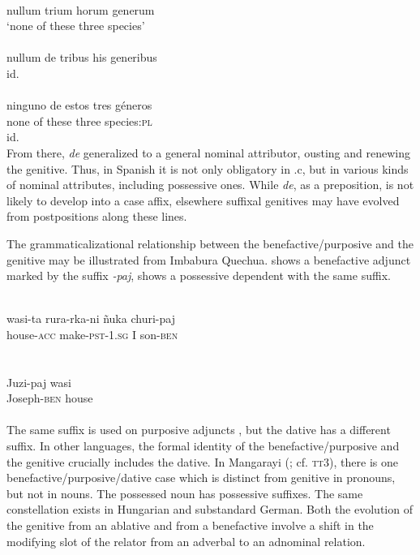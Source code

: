 \ea \label{ex:E46} 
\ea {} \\ 
nullum trium horum generum\\
\glt ‘none of these three species’\\
\ex  {} \\
 nullum de tribus his generibus\\
\glt id. \\
\ex
{} \\
\gll  ninguno  de  estos  tres géneros \\
   none  of  these  three  species:\textsc{pl}  \\
 \glt id.\\
\z
\z
\noindent From there, \textit{de} generalized to a general nominal attributor, ousting and renewing the genitive. Thus, in Spanish it is not only obligatory in .c, but in various kinds of nominal attributes, including possessive ones. While \textit{de}, as a preposition, is not likely to develop into a case affix, elsewhere suffixal genitives may have evolved from postpositions along these lines.

The grammaticalizational relationship between the benefactive/purposive and the genitive may be illustrated from Imbabura Quechua.  shows a benefactive adjunct marked by the suffix \textit{{}-paj},  shows a possessive dependent with the same suffix.\label{page79}

\ea\label{ex:E47}
\\
\gll  wasi-ta  rura-rka-ni  ñuka  churi-paj\\
 house-\textsc{acc}  make-\textsc{pst}-1.\textsc{sg}  I  son-\textsc{ben}\\
\\
\z
\noindent \ea\label{ex:E48}
 \\
\gll   Juzi-paj  wasi\\
Joseph-\textsc{ben}  house\\
\\
\z
\noindent The same suffix is used on purposive adjuncts \citep[116f]{Cole1982}, but the dative has a different suffix. In other languages, the formal identity of the benefactive/purposive and the genitive crucially includes the dative. In Mangarayi (\citealt[66--76]{Merlan1982}; cf. \textsc{tt}3), there is one benefactive/purposive/dative case which is distinct from genitive in pronouns, but not in nouns. The possessed noun has possessive suffixes. The same constellation exists in Hungarian and substandard German. Both the evolution of the genitive from an ablative and from a benefactive involve a shift in the modifying slot of the relator from an adverbal to an adnominal relation.

